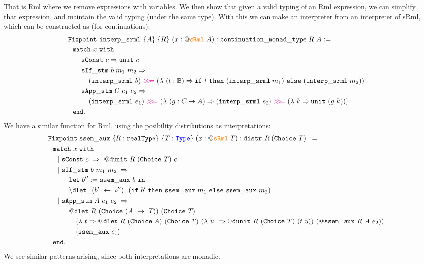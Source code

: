 \documentclass[11pt, leqno]{article}
\newcommand{\set}[1]{\{#1\}}
\newcommand{\sRml}{\textcolor{orange}{\mathtt{sRml}}}
\newcommand{\Type}{\textcolor{blue}{\mathtt{Type}}}
\newcommand{\bind}{\textcolor{magenta}{>\!\!>\!\!=}}
\begin{document}
That is Rml where we remove expressions with variables. We then show that given a valid typing of an Rml expression, we can simplify that expression, and maintain the valid typing (under the same type). With this we can make an interpreter from an interpreter of sRml, which can be constructed as (for continuations):
\begin{align*}  
  &\mathtt{Fixpoint}~\mathtt{interp\_srml}~\set{A}~\set{R}~(x : @\sRml~A) : \mathtt{continuation\_monad\_type}~R~A := \\
  &~~\mathtt{match}~x~\mathtt{with} \\
  &~~~~|~ \mathtt{sConst}~c \Rightarrow \mathtt{unit}~c \\
  &~~~~|~ \mathtt{sIf\_stm}~b~m_1~m_2 \Rightarrow \\
  & \qquad \quad (\mathtt{interp\_srml}~b)~\bind~(\lambda~(t : \mathbb{B}) \Rightarrow \mathtt{if}~t~\mathtt{then}~(\mathtt{interp\_srml}~m_1)~\mathtt{else}~(\mathtt{interp\_srml}~m_2)) \\
  &~~~~|~ \mathtt{sApp\_stm}~C~e_1~e_2 \Rightarrow \\
  & \qquad \quad (\mathtt{interp\_srml}~e_1)~\bind~(\lambda~(g : C \rightarrow A) \Rightarrow (\mathtt{interp\_srml}~e_2)~\bind~(\lambda~k \Rightarrow \mathtt{unit}~(g~k)))\\
  &~~\mathtt{end}.
\end{align*}
We have a similar function for Rml, using the posibility distributions as interpretations:
\begin{align*}
  &\mathtt{Fixpoint}~\mathtt{ssem\_aux}~\set{R : \mathtt{realType}}~\set{T : \Type}~(x : @\sRml~T) : \mathtt{distr}~R~(\mathtt{Choice}~T)~:=\\
  &~~\mathtt{match}~x~\mathtt{with}\\
  &~~~~|~\mathtt{sConst}~c~\Rightarrow~@\mathtt{dunit}~R~(\mathtt{Choice}~T)~c\\
  &~~~~|~\mathtt{sIf\_stm}~b~m_1~m_2~\Rightarrow\\
  & \qquad \quad \mathtt{let}~b'':= \mathtt{ssem\_aux}~b~\mathtt{in}\\
  & \qquad \quad \backslash\mathtt{dlet}\_(b'~\leftarrow~b'')~~(\mathtt{if}~b'~\mathtt{then}~\mathtt{ssem\_aux}~m_1~\mathtt{else}~\mathtt{ssem\_aux}~m_2)\\
  &~~~~|~\mathtt{sApp\_stm}~A~e_1~e_2~\Rightarrow\\
  & \qquad \quad @\mathtt{dlet}~R~(\mathtt{Choice}~(A~\rightarrow~T))~(\mathtt{Choice}~T)~\\
  &~\qquad~\quad~(\lambda~t \Rightarrow @\mathtt{dlet}~R~(\mathtt{Choice}~A)~(\mathtt{Choice}~T)~(\lambda~u~\Rightarrow @\mathtt{dunit}~R~(\mathtt{Choice}~T)~(t~u))~(@\mathtt{ssem\_aux}~R~A~e_2))\\
  &~\qquad~\quad~(\mathtt{ssem\_aux}~e_1)\\
  &~~\mathtt{end}.
\end{align*}
We see similar patterns arising, since both interpretations are monadic.
\end{document}

